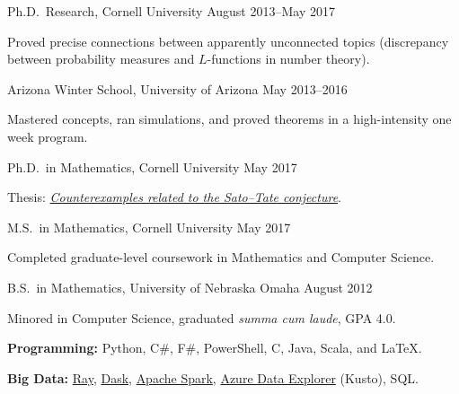 \documentclass[11pt, letterpaper]{awesome-cv}
\begin{document}
\begin{cventries}
\cventry
  {Ph.D.~Research, Cornell University}
  {}{}
  {August 2013--May 2017}
  {
    \begin{cvitems}
      \item{Proved precise connections between apparently unconnected topics (discrepancy between probability measures and $L$-functions in number theory).}
    \end{cvitems}
  }

\cventry
  {Arizona Winter School, University of Arizona}
  {}{}
  {May 2013--2016}
  {
    \begin{cvitems}
      \item{Mastered concepts, ran simulations, and proved theorems in a high-intensity one week program.}
    \end{cvitems}
  }
\end{cventries}






\begin{cventries}

\cventry
  {Ph.D.~in Mathematics, Cornell University}
  {}{}
  {May 2017}
  {
    \begin{cvitems}
      \item{Thesis: \href{http://doi.org/10.7298/X4PN93Q3}{\emph{Counterexamples related to the Sato--Tate conjecture}}.}
    \end{cvitems}
  }
  
\cventry
  {M.S.~in Mathematics, Cornell University}
  {}{}
  {May 2017}
  {
    \begin{cvitems}
      \item{Completed graduate-level coursework in Mathematics and Computer Science.}
    \end{cvitems}
  }
  
\cventry
  {B.S.~in Mathematics, University of Nebraska Omaha}
  {}{}
  {August 2012}
  {
    \begin{cvitems}
      \item{Minored in Computer Science, graduated \emph{summa cum laude}, GPA 4.0.}
    \end{cvitems}
  }
  
\end{cventries}






\begin{cvparagraph}
\textbf{Programming:} Python, C\#, F\#, PowerShell, C, Java, Scala, and \LaTeX.

\textbf{Big Data:}
\href{https://www.ray.io/}{Ray},
\href{https://dask.org/}{Dask},
\href{https://spark.apache.org/}{Apache Spark},
\href{https://docs.microsoft.com/en-us/azure/kusto/query/index}{Azure Data Explorer} (Kusto),
SQL.
\end{cvparagraph}
\end{document}
